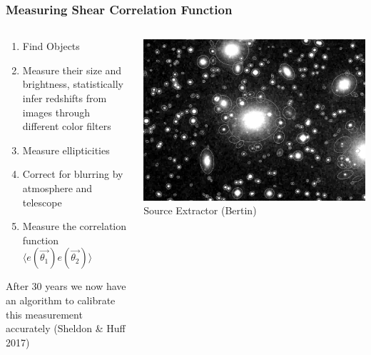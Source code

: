 \documentclass{beamer}
\begin{document}
{\begin{columns}
    \end{columns}


}

\frame
{

    \frametitle{Measuring Shear Correlation Function}


    \begin{columns}
        \begin{column}{0.5\textwidth}
            \begin{enumerate}

                \item Find Objects

                \item Measure their size and brightness, statistically infer redshifts from
                    images through different color filters
                    
                \item Measure ellipticities

                \item Correct for blurring by atmosphere and telescope

                \item Measure the correlation function
                    {\color{gold} $\langle e(\vec{\theta_1}) e(\vec{\theta_2}) \rangle$ }



            \end{enumerate}

            After 30 years we now have an algorithm to calibrate
                this measurement accurately (Sheldon \& Huff 2017)

        \end{column}
        \begin{column}{0.5\textwidth}

            \begin{center}
                \includegraphics[width=\textwidth]{sun226_fig.png}
                \newline
                {\tiny Source Extractor (Bertin)}
            \end{center}


\end{column}
\end{columns}}
\end{document}
